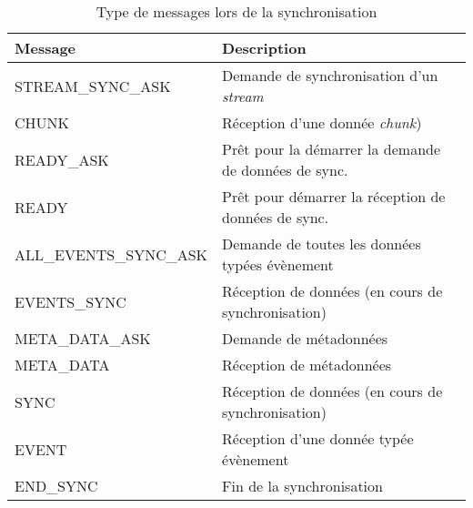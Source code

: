 \begin{table}[]
	\centering
	\small
	\caption{Type de messages lors de la synchronisation}
	\label{table:messagetype}
	\begin{tabular}{ll}
		 \toprule
		\textbf{Message}                & \textbf{Description} \\ \hline
		STREAM\_SYNC\_ASK      &  Demande de synchronisation d'un 
		\textit{stream}           \\
		CHUNK                  &     Réception d'une donnée \textit{chunk})        
		\\
		READY\_ASK             &      Prêt pour la démarrer la demande de 
		données de 
		sync.        \\
		READY                  &       Prêt pour démarrer la réception de 
		données de 
		sync.      \\
		ALL\_EVENTS\_SYNC\_ASK &     Demande de toutes les données 
		typées 
		évènement           \\
		EVENTS\_SYNC           &        Réception de données (en cours de 
		synchronisation)       \\
		META\_DATA\_ASK        &     Demande de métadonnées       \\
		META\_DATA             &      Réception de métadonnées       \\
		SYNC                   &      Réception de données (en cours de 
		synchronisation)         \\
		EVENT                  &     Réception d'une donnée typée 
		évènement        \\
		END\_SYNC              & Fin de la synchronisation \\ \bottomrule
	\end{tabular}
\end{table}

